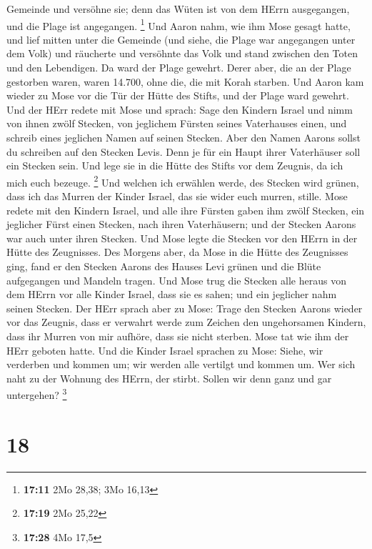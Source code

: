 Gemeinde und versöhne sie; denn das Wüten ist von dem HErrn ausgegangen,
und die Plage ist angegangen. \footnote{\textbf{17:11} 2Mo 28,38; 3Mo
  16,13}  Und Aaron nahm, wie ihm Mose gesagt hatte, und
lief mitten unter die Gemeinde (und siehe, die Plage war angegangen
unter dem Volk) und räucherte und versöhnte das Volk  und
stand zwischen den Toten und den Lebendigen. Da ward der Plage gewehrt.
 Derer aber, die an der Plage gestorben waren, waren
14.700, ohne die, die mit Korah starben.  Und Aaron kam
wieder zu Mose vor die Tür der Hütte des Stifts, und der Plage ward
gewehrt.  Und der HErr redete mit Mose und sprach:
 Sage den Kindern Israel und nimm von ihnen zwölf Stecken,
von jeglichem Fürsten seines Vaterhauses einen, und schreib eines
jeglichen Namen auf seinen Stecken.  Aber den Namen Aarons
sollst du schreiben auf den Stecken Levis. Denn je für ein Haupt ihrer
Vaterhäuser soll ein Stecken sein.  Und lege sie in die
Hütte des Stifts vor dem Zeugnis, da ich mich euch bezeuge. \footnote{\textbf{17:19}
  2Mo 25,22}  Und welchen ich erwählen werde, des Stecken
wird grünen, dass ich das Murren der Kinder Israel, das sie wider euch
murren, stille.  Mose redete mit den Kindern Israel, und
alle ihre Fürsten gaben ihm zwölf Stecken, ein jeglicher Fürst einen
Stecken, nach ihren Vaterhäusern; und der Stecken Aarons war auch unter
ihren Stecken.  Und Mose legte die Stecken vor den HErrn in
der Hütte des Zeugnisses.  Des Morgens aber, da Mose in die
Hütte des Zeugnisses ging, fand er den Stecken Aarons des Hauses Levi
grünen und die Blüte aufgegangen und Mandeln tragen.  Und
Mose trug die Stecken alle heraus von dem HErrn vor alle Kinder Israel,
dass sie es sahen; und ein jeglicher nahm seinen Stecken. 
Der HErr sprach aber zu Mose: Trage den Stecken Aarons wieder vor das
Zeugnis, dass er verwahrt werde zum Zeichen den ungehorsamen Kindern,
dass ihr Murren von mir aufhöre, dass sie nicht sterben. 
Mose tat wie ihm der HErr geboten hatte.  Und die Kinder
Israel sprachen zu Mose: Siehe, wir verderben und kommen um; wir werden
alle vertilgt und kommen um.  Wer sich naht zu der Wohnung
des HErrn, der stirbt. Sollen wir denn ganz und gar untergehen?
\footnote{\textbf{17:28} 4Mo 17,5}

\hypertarget{section-3}{%
\section{18}\label{section-3}}

